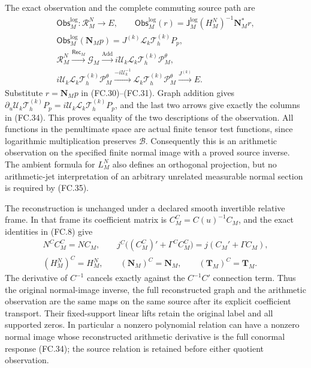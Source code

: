 The exact observation and the complete commuting source path are
\[
 \begin{gathered}
 \mathsf{Obs}_M^{\log}:\mathscr R_M^N\to E,\qquad
 \mathsf{Obs}_M^{\log}(r)
       =\mathsf J_M^{\log}(H_M^N)^{-1}\mathbf N_M^*r,\\
 \mathsf{Obs}_M^{\log}(\mathbf N_Mp)
       =J^{(k)}\mathscr L_k\mathcal T_h^{(k)}P_p,\\
 \mathscr R_M^N\xrightarrow{\mathsf{Rec}_M}\mathscr G_M
 \xrightarrow{\operatorname{Add}}
     i\mathscr U_k\mathscr L_k\mathcal T_h^{(k)}\mathcal P_M^\theta,\\
 i\mathscr U_k\mathscr L_k\mathcal T_h^{(k)}\mathcal P_M^\theta
 \xrightarrow{-i\mathscr U_k^{-1}}
     \mathscr L_k\mathcal T_h^{(k)}\mathcal P_M^\theta
 \xrightarrow{J^{(k)}}E.
 \end{gathered}
 \tag{FC.35}
\]
Substitute \(r=\mathbf N_Mp\) in (FC.30)--(FC.31).
Graph addition gives
\(\partial_u\mathscr U_k\mathcal T_h^{(k)}P_p
=i\mathscr U_k\mathscr L_k\mathcal T_h^{(k)}P_p\),
and the last two arrows give exactly the columns in (FC.34).
This proves equality of the two descriptions of the observation.
All functions in the penultimate space are actual finite tensor test
functions, since logarithmic multiplication preserves \(\mathscr B\).
Consequently this is an arithmetic observation on the specified
finite normal image with a proved source inverse. The ambient formula
for \(L_M^N\) also defines an orthogonal projection, but no
arithmetic-jet interpretation of an arbitrary unrelated measurable
normal section is required by (FC.35).

The reconstruction is unchanged under a declared smooth invertible
relative frame. In that frame its coefficient matrix is
\(C_M^C=C(u)^{-1}C_M\), and the exact identities in (FC.8) give
\[
 \begin{gathered}
 N^CC_M^C=NC_M,\qquad
 j^C\bigl((C_M^C)'+\Gamma^CC_M^C\bigr)
                  =j(C_M'+\Gamma C_M),\\
 (H_M^N)^C=H_M^N,\qquad
 (\mathbf N_M)^C=\mathbf N_M,\qquad
 (\mathbf T_M)^C=\mathbf T_M.
 \end{gathered}
 \tag{FC.36}
\]
The derivative of \(C^{-1}\) cancels exactly against the
\(C^{-1}C'\) connection term. Thus the original normal-image
inverse, the full reconstructed graph and the arithmetic observation
are the same maps on the same source after its explicit coefficient
transport. Their fixed-support linear lifts retain the original
label and all supported zeros. In particular a nonzero polynomial
relation can have a nonzero normal image whose reconstructed
arithmetic derivative is the full conormal response (FC.34);
the source relation is retained before either quotient observation.
